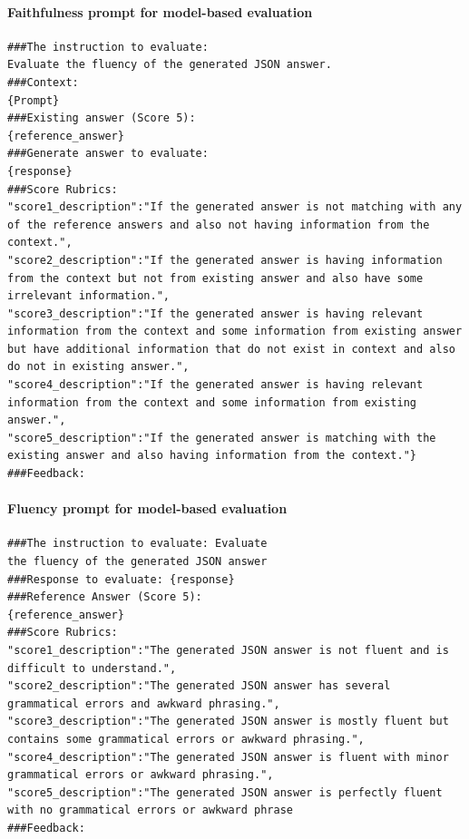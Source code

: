 \paragraph{Faithfulness prompt for model-based evaluation}

\begin{lstlisting}[style=textstyle, frame = single, caption=Prompt structured correctness \citep{kim2024prometheus2opensource}, label=code:estructured-faithfulness]
###The instruction to evaluate:
Evaluate the fluency of the generated JSON answer.
###Context:
{Prompt}
###Existing answer (Score 5):
{reference_answer}
###Generate answer to evaluate:
{response}
###Score Rubrics:
"score1_description":"If the generated answer is not matching with any of the reference answers and also not having information from the context.",
"score2_description":"If the generated answer is having information from the context but not from existing answer and also have some irrelevant information.",
"score3_description":"If the generated answer is having relevant information from the context and some information from existing answer but have additional information that do not exist in context and also do not in existing answer.",
"score4_description":"If the generated answer is having relevant information from the context and some information from existing answer.",
"score5_description":"If the generated answer is matching with the existing answer and also having information from the context."}
###Feedback:
\end{lstlisting}

\paragraph{Fluency prompt for model-based evaluation}

\begin{lstlisting}[style=textstyle, frame = single, caption=Prompt structured fluency \citep{kim2024prometheus2opensource}, label=code:estructured-fluency]
###The instruction to evaluate: Evaluate 
the fluency of the generated JSON answer
###Response to evaluate: {response}
###Reference Answer (Score 5): 
{reference_answer}
###Score Rubrics:
"score1_description":"The generated JSON answer is not fluent and is difficult to understand.",
"score2_description":"The generated JSON answer has several grammatical errors and awkward phrasing.",
"score3_description":"The generated JSON answer is mostly fluent but contains some grammatical errors or awkward phrasing.",
"score4_description":"The generated JSON answer is fluent with minor grammatical errors or awkward phrasing.",
"score5_description":"The generated JSON answer is perfectly fluent with no grammatical errors or awkward phrase
###Feedback:
\end{lstlisting}


